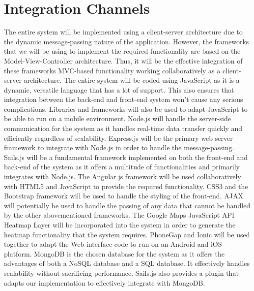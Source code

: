 \documentclass[11pt,fleqn]{book} %
\begin{document}
	\section{Integration Channels}
	The entire system will be implemented using a client-server architecture due to the dynamic message-passing nature of the application. However, the frameworks that we will be using to implement the required functionality are based on the Model-View-Controller architecture. Thus, it will be the effective integration of these frameworks MVC-based functionality working collaboratively as a client-server architecture. The entire system will be coded using JavaScript as it is a dynamic, versatile language that has a lot of support. This also ensures that integration between the back-end and front-end system won’t cause any serious complications. Libraries and frameworks will also be used to adapt JavaScript to be able to run on a mobile environment.\newline\newline
	Node.js will handle the server-side communication for the system as it handles real-time data transfer quickly and efficiently regardless of scalability. Express.js will be the primary web server framework to integrate with Node.js in order to handle the message-passing. Sails.js will be a fundamental framework implemented on both the front-end and back-end of the system as it offers a multitude of functionalities and primarily integrates with Node.js. The Angular.js framework will be used collaboratively with HTML5 and JavaScript to provide the required functionality. CSS3 and the Bootstrap framework will be used to handle the styling of the front-end. AJAX will potentially be used to handle the passing of any data that cannot be handled by the other abovementioned frameworks. The Google Maps JavaScript API Heatmap Layer will be incorporated into the system in order to generate the heatmap functionality that the system requires. PhoneGap and Ionic will be used together to adapt the Web interface code to run on an Android  and iOS platform.\newline\newline
	MongoDB is the chosen database for the system as it offers the advantages of both a NoSQL database and a SQL database. It effectively handles scalability without sacrificing performance. Sails.js also provides a plugin that adapts our implementation to effectively integrate with MongoDB.
	
	
	
\end{document}
